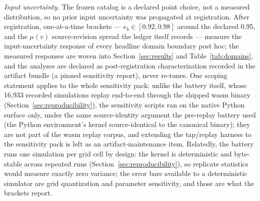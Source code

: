 \emph{Input uncertainty.} The frozen catalog is a declared point choice,
not a measured distribution, so no prior input uncertainty was propagated
at registration. After registration, one-at-a-time brackets --- $e_b \in
[0.92, 0.98]$ around the declared 0.95, and the $\mu(v)$ source-revision
spread the ledger itself records ---
measure the input-uncertainty response of every headline domain boundary
post hoc; the measured responses are woven into Section~\ref{sec:results}
and Table~\ref{tab:domains}, and the analyses are declared as
post-registration characterization recorded in the artifact bundle (a
pinned sensitivity report), never re-tunes. One scoping
statement applies to the whole sensitivity pack: unlike the battery
itself, whose 16{,}933 recorded simulations replay end-to-end through
the shipped wasm binary (Section~\ref{sec:reproducibility}), the
sensitivity scripts ran on the native Python surface only, under the
same source-identity argument the pre-replay battery used (the Python
environment's kernel source-identical to the canonical binary); they are
not part of
the wasm replay corpus, and extending the tap/replay harness to the
sensitivity pack is left as an artifact-maintenance item. Relatedly, the
battery runs one simulation per grid cell by design: the kernel is
deterministic and byte-stable across repeated runs
(Section~\ref{sec:reproducibility}), so replicate statistics would measure
exactly zero variance; the error bars available to a deterministic
simulator are grid quantization and parameter sensitivity, and those are
what the brackets report.

